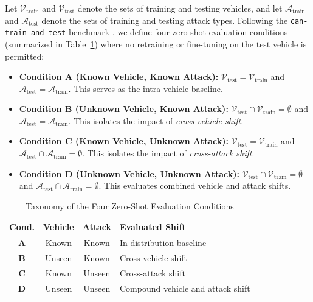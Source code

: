 \documentclass[12pt, a4paper, reqno, oneside]{book}
\begin{document}
Let $\mathcal{V}_{\text{train}}$ and $\mathcal{V}_{\text{test}}$ denote the sets of training and testing vehicles, and let $\mathcal{A}_{\text{train}}$ and $\mathcal{A}_{\text{test}}$ denote the sets of training and testing attack types. Following the \texttt{can-train-and-test} benchmark \cite{lampe2023cantrain, lampe2024curated}, we define four zero-shot evaluation conditions (summarized in Table~\ref{tab:eval_conditions}) where no retraining or fine-tuning on the test vehicle is permitted:
\begin{itemize}
    \item \textbf{Condition A (Known Vehicle, Known Attack):} $\mathcal{V}_{\text{test}} = \mathcal{V}_{\text{train}}$ and $\mathcal{A}_{\text{test}} = \mathcal{A}_{\text{train}}$. This serves as the intra-vehicle baseline.
    \item \textbf{Condition B (Unknown Vehicle, Known Attack):} $\mathcal{V}_{\text{test}} \cap \mathcal{V}_{\text{train}} = \emptyset$ and $\mathcal{A}_{\text{test}} = \mathcal{A}_{\text{train}}$. This isolates the impact of \textit{cross-vehicle shift}.
    \item \textbf{Condition C (Known Vehicle, Unknown Attack):} $\mathcal{V}_{\text{test}} = \mathcal{V}_{\text{train}}$ and $\mathcal{A}_{\text{test}} \cap \mathcal{A}_{\text{train}} = \emptyset$. This isolates the impact of \textit{cross-attack shift}.
    \item \textbf{Condition D (Unknown Vehicle, Unknown Attack):} $\mathcal{V}_{\text{test}} \cap \mathcal{V}_{\text{train}} = \emptyset$ and $\mathcal{A}_{\text{test}} \cap \mathcal{A}_{\text{train}} = \emptyset$. This evaluates combined vehicle and attack shifts.
\end{itemize}

\begin{table}[htbp]
\caption{Taxonomy of the Four Zero-Shot Evaluation Conditions \cite{lampe2023cantrain, lampe2024curated}}
\label{tab:eval_conditions}
\centering
\renewcommand{\arraystretch}{1.25}
\begin{tabularx}{\textwidth}{c c c X}
\hline
\textbf{Cond.} & \textbf{Vehicle} & \textbf{Attack} & \textbf{Evaluated Shift} \\
\hline
\textbf{A} & Known & Known & In-distribution baseline \\
\textbf{B} & Unseen & Known & Cross-vehicle shift \\
\textbf{C} & Known & Unseen & Cross-attack shift \\
\textbf{D} & Unseen & Unseen & Compound vehicle and attack shift \\
\hline
\end{tabularx}
\end{table}
\end{document}
